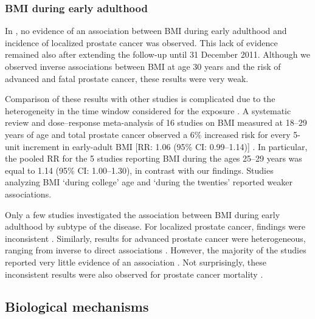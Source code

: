 
\subsubsection{BMI during early adulthood}

In , no evidence of an association  between BMI during early adulthood and incidence of localized prostate cancer was observed. This lack of evidence remained also after extending the follow-up until 31 December 2011. Although we observed inverse associations between BMI at age 30 years and the risk of advanced and fatal prostate cancer, these results were very weak.

Comparison of these results with other studies is complicated due to the heterogeneity in the time window considered for the exposure \citep{robinson_systematic_2008, sutcliffe_prostate_2013}. A systematic review and dose--response meta-analysis of 16 studies on BMI measured at 18--29 years of age and total prostate cancer observed a 6\% increased risk for every 5-unit increment in early-adult BMI [RR: 1.06 (95\% CI: 0.99--1.14)]  \citep{robinson_systematic_2008}. In particular, the pooled RR for the 5 studies reporting BMI during the ages 25--29 years was equal to 1.14 (95\% CI: 1.00--1.30), in contrast with our findings. Studies analyzing BMI `during college' age and `during the twenties' reported weaker associations.

Only a few studies investigated the association between BMI during early adulthood by subtype of the disease. For localized prostate cancer, findings were inconsistent \citep{schuurman_anthropometry_2000, littman_anthropometrics_2007, wright_prospective_2007}. 
Similarly, results for advanced prostate cancer were heterogeneous, ranging from inverse \citep{moller_body_2015} to direct associations \citep{schuurman_anthropometry_2000, dalmaso_prostate_2004}. However, the majority of the studies reported very little evidence of an association \citep{giles_early_2003, robinson_obesity_2005, littman_anthropometrics_2007, wright_prospective_2007, moller_lifetime_2013}. Not surprisingly, these inconsistent results were also observed for prostate cancer mortality \citep{wright_prospective_2007, burton_young_2010, moller_lifetime_2013, moller_body_2015}.


\subsection{Biological mechanisms}

